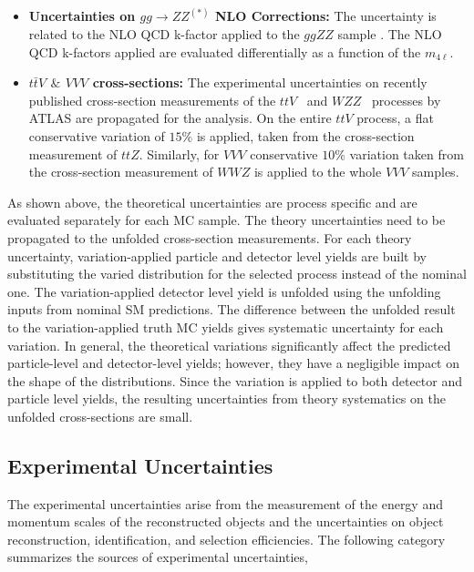 \begin{itemize}
\item{\textbf{Uncertainties on $gg\rightarrow ZZ^{(\ast)}$ NLO Corrections:}
The uncertainty is related to the NLO QCD k-factor applied to the $ggZZ$ sample \cite{ggZZNLOUnc}. The NLO QCD k-factors applied are evaluated differentially as a function of the $m_{4\ell}$. 
}

\item{\textbf{$t\bar{t}V$ $\&$ $VVV$ cross-sections:}
The experimental uncertainties on recently published cross-section measurements of the $ttV$~\cite{ATLAS_ttV} and $WZZ$~\cite{ATLAS_VVV} processes by ATLAS are propagated for the analysis. On the entire $ttV$ process, a flat conservative variation of $15\%$ is applied, taken from the cross-section measurement of $ttZ$. Similarly, for $VVV$ conservative $10\%$ variation taken from the cross-section measurement of $WWZ$ is applied to the whole $VVV$ samples.
}

\end{itemize}

As shown above, the theoretical uncertainties are process specific and are evaluated separately for each MC sample. The theory uncertainties need to be propagated to the unfolded cross-section measurements. For each theory uncertainty, variation-applied particle and detector level yields are built by substituting the varied distribution for the selected process instead of the nominal one. The variation-applied detector level yield is unfolded using the unfolding inputs from nominal SM predictions. The difference between the unfolded result to the variation-applied truth MC yields gives systematic uncertainty for each variation. In general, the theoretical variations significantly affect the predicted particle-level and detector-level yields; however, they have a negligible impact on the shape of the distributions. Since the variation is applied to both detector and particle level yields, the resulting uncertainties from theory systematics on the unfolded cross-sections are small.

\subsection{Experimental Uncertainties}
\label{subsec:ExpUnc}
The experimental uncertainties arise from the measurement of the energy and momentum scales of the reconstructed objects and the uncertainties on object reconstruction, identification, and selection efficiencies. The following category summarizes the sources of experimental uncertainties,

